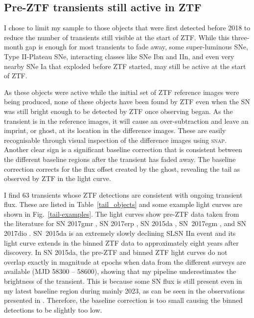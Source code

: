 \documentclass[a4paper,oneside,12pt, class=Latex/Classes/PhDthesisPSnPDF, crop=false]{standalone}
\begin{document}
\subsection{Pre-ZTF transients still active in ZTF}
\label{tails}
I chose to limit my sample to those objects that were first detected before 2018 to reduce the number of transients still visible at the start of ZTF. While this three-month gap is enough for most transients to fade away, some super-luminous SNe, Type II-Plateau SNe, interacting classes like SNe Ibn and IIn, and even very nearby SNe Ia that exploded before ZTF started, may still be active at the start of ZTF.

As these objects were active while the initial set of ZTF reference images were being produced, none of these objects have been found by ZTF even when the SN was still bright enough to be detected by ZTF once observing began. As the transient is in the reference images, it will cause an over-subtraction and leave an imprint, or ghost, at its location in the difference images. These are easily recognisable through visual inspection of the difference images using \textsc{snap}. Another clear sign is a significant baseline correction that is consistent between the different baseline regions after the transient has faded away. The baseline correction corrects for the flux offset created by the ghost, revealing the tail as observed by ZTF in the light curve.

I find 63 transients whose ZTF detections are consistent with ongoing transient flux. These are listed in Table~\ref{tail_objects} and some example light curves are shown in Fig.~\ref{tail-examples}. The light curves show pre-ZTF data taken from the literature for  SN 2017gmr \cite[][]{2017gmr},  SN 2017erp \cite[][]{2017erp}, SN 2015da \cite[][]{2015da_2020}, SN~2017egm \cite[][]{2017egm}, and SN 2017dio \cite[][]{2017dio}. SN~2015da is an extremely slowly declining SLSN IIn event \citep{2015da_2020, 2015da_2024} and its light curve extends in the binned ZTF data to approximately eight years after discovery. In SN 2015da, the pre-ZTF and binned ZTF light curves do not overlap exactly in magnitude at epochs when data from the different surveys are available (MJD 58300 -- 58600), showing that my pipeline underestimates the brightness of the transient. This is because some SN flux is still present even in my latest baseline region during mainly 2023, as can be seen in the observations presented in \citet{2015da_2024}. Therefore, the baseline correction is too small causing the binned detections to be slightly too low.
\end{document}
